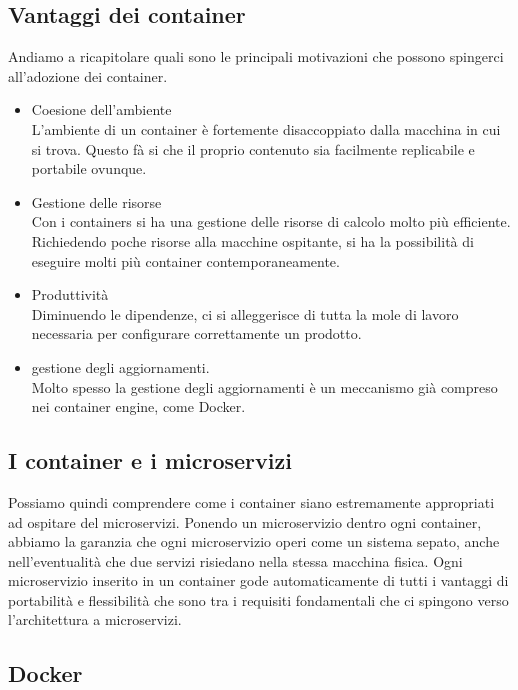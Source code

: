 \subsection{Vantaggi dei container}
Andiamo a ricapitolare quali sono le principali motivazioni che possono spingerci all'adozione dei container.
\begin{itemize}
	\item Coesione dell'ambiente \\
	L'ambiente di un container è fortemente disaccoppiato dalla macchina in cui si trova. Questo fà si che il proprio contenuto sia facilmente replicabile e portabile ovunque.
	
	\item Gestione delle risorse \\
	Con i containers si ha una gestione delle risorse di calcolo molto più efficiente. Richiedendo poche risorse alla macchine ospitante, si ha la possibilità di eseguire molti più container contemporaneamente. 
	
	\item Produttività \\
	Diminuendo le dipendenze, ci si alleggerisce di tutta la mole di lavoro necessaria per configurare correttamente un prodotto. 
	
	\item gestione degli aggiornamenti. \\
	Molto spesso la gestione degli aggiornamenti è un meccanismo già compreso nei container engine, come Docker.
\end{itemize}

\subsection{I container e i microservizi}
Possiamo quindi comprendere come i container siano estremamente appropriati ad ospitare del microservizi. Ponendo un microservizio dentro ogni container, abbiamo la garanzia che ogni microservizio operi come un sistema sepato, anche nell'eventualità che due servizi risiedano nella stessa macchina fisica. Ogni microservizio inserito in un container gode automaticamente di tutti i vantaggi di portabilità e flessibilità che sono tra i requisiti fondamentali che ci spingono verso l'architettura a microservizi.

\subsection{Docker}

